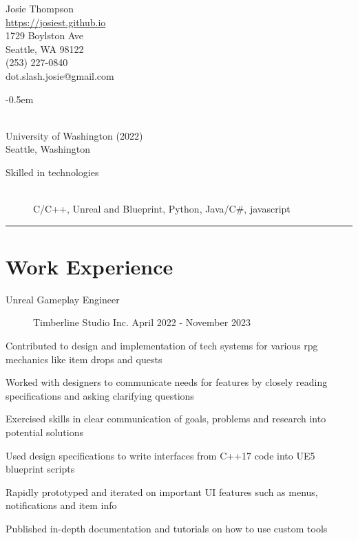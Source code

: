 \documentclass[10pt]{article}
\newenvironment{itemize*}
{\begin{itemize}[leftmargin=*]
    \setlength{\parskip}{0.5pt}}
{\end{itemize}}
\begin{document}
\begin{paracol}{2}
\noindent
\parbox[t]{0.5\textwidth}{
    {\sffamily\Huge Josie Thompson}\medskip\\
    \url{https://josiest.github.io}\\
    1729 Boylston Ave\\
    Seattle, WA 98122\\
    (253) 227-0840\\
    dot.slash.josie@gmail.com
}
\switchcolumn

\begin{description}
\itemsep -0.5em
\item[B.S. in Computer Science] \hfill \\
    University of Washington (2022)\\
    Seattle, Washington
\end{description}

\begin{description}
\item[Skilled in technologies] \hfill \\
C/C++, Unreal and Blueprint, Python, Java/C\#, javascript
\end{description}

\end{paracol}
\vspace{12pt}
\hrule

\section*{Work Experience}

\begin{description}
\item[Unreal Gameplay Engineer] Timberline Studio Inc.
    \hfill April 2022 - November 2023
\end{description}
\begin{itemize*}
\item Contributed to design and implementation of tech systems for various
      rpg mechanics like item drops and quests
\item Worked with designers to communicate needs for features by closely
      reading specifications and asking clarifying questions
\item Exercised skills in clear communication of goals, problems and research
      into potential solutions
\item Used design specifications to write interfaces from C++17 code into
      UE5 blueprint scripts
\item Rapidly prototyped and iterated on important UI features such as menus,
      notifications and item info
\item Published in-depth documentation and tutorials on how to use custom tools
\end{itemize*}
\vspace{10pt}
\end{document}
